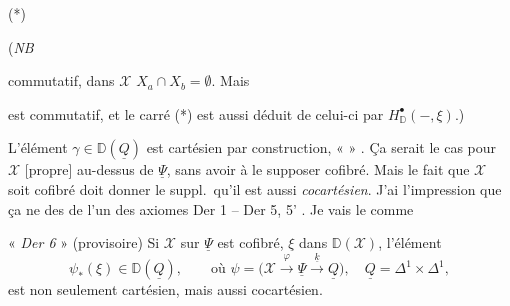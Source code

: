 \documentclass[11pt,a4paper]{article}
\begin{document}
(*)


(\emph{NB}


 commutatif, dans $\mathcal{X}$ \ill{} $X_a \cap X_b = \emptyset$. Mais


est commutatif, et le carré (*) est aussi déduit de celui-ci par $H^{\bullet}_{\mathbb{D}}(-, \xi)$.)

L'élément $\gamma \in \mathbb{D}(\underline{Q})$ est cartésien par construction,  «  » \ill{} \ill{}. Ça serait le cas pour  \ill{} $\mathcal{X}$ [propre] au-dessus de $\underline{\Psi}$, sans avoir à le supposer cofibré. Mais le fait que $\mathcal{X}$ soit cofibré doit donner \ill{} \ill{} le  \ill{} suppl.\ qu'il est aussi \emph{cocartésien}. J'ai l'impression \ill{} \ill{} \ill{} que ça ne  \ill{} des  \ill{} de l'un des axiomes Der 1 -- Der 5, 5' . Je vais le  comme

« \emph{Der 6} » (provisoire)  Si $\mathcal{X}$ sur $\underline{\Psi}$ est cofibré, \struck{\ill{}} $\xi$  \ill{} dans $\mathbb{D}(\mathcal{X})$, \struck{\ill{}} l'élément
\[
  \psi_*(\xi) \in \mathbb{D}(\underline{Q}) , \qquad \text{où } \psi = \bigl(\mathcal{X} \xrightarrow{\varphi} \underline{\Psi} \xrightarrow{\underline{k}} \underline{Q}\bigr), \quad \underline{Q} = \Delta^1 \times \Delta^1 ,
\]
est non seulement cartésien, mais aussi cocartésien.
\end{document}
